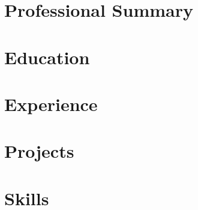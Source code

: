 \documentclass[a4paper]{article}
\begin{document}


\vspace{-2pt}
\section{Professional Summary}


\section{Education}
\resumeSubHeadingListStart

\resumeSubHeadingListEnd

\section{Experience}
\resumeSubHeadingListStart


\resumeSubHeadingListEnd

\section{Projects}
\projectSubheadingListStart





% 
% 
% 
% 
\projectSubheadingListEnd

\section{Skills}
\resumeSubHeadingListStart

\resumeSubHeadingListEnd

% 
\end{document}
